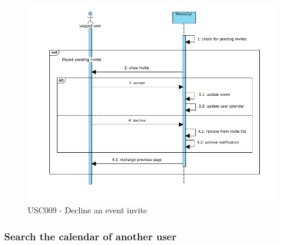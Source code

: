 \documentclass[10pt,a4paper,titlepage]{article}
\begin{document}
\begin{figure}[h]
\centering
\includegraphics[width=\linewidth]{./Sequence_diag/USC009.png}
\caption[USC009]{USC009 - Decline an event invite}
\label{fig:USC009}
\end{figure}

\clearpage
\subsubsection{Search the calendar of another user}
\end{document}
